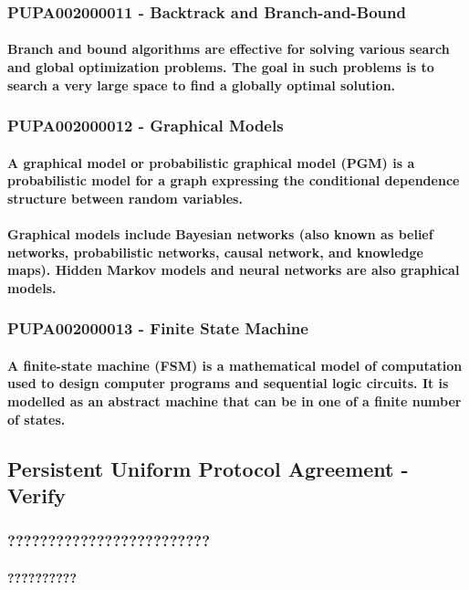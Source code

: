 \documentclass{acm_proc_article-sp}
\begin{document}
\subsubsection{PUPA002000011 - Backtrack and Branch-and-Bound}
\paragraph{Branch and bound algorithms are effective for solving various search and global optimization problems. The goal in such problems is to search a very large space to find a globally optimal solution.}
\subsubsection{PUPA002000012 - Graphical Models}
\paragraph{A graphical model or probabilistic graphical model (PGM) is a probabilistic model for a graph expressing the conditional dependence structure between random variables.}
\paragraph{Graphical models include Bayesian networks (also known as belief networks, probabilistic networks, causal network, and knowledge maps). Hidden Markov models and neural networks are also graphical models.}
\subsubsection{PUPA002000013 - Finite State Machine}
\paragraph{A finite-state machine (FSM) is a mathematical model of computation used to design computer programs and sequential logic circuits. It is modelled as an abstract machine that can be in one of a finite number of states.}
\subsection{Persistent Uniform Protocol Agreement - Verify}
\subsubsection{?????????????????????????}
\paragraph{??????????}
\end{document}
